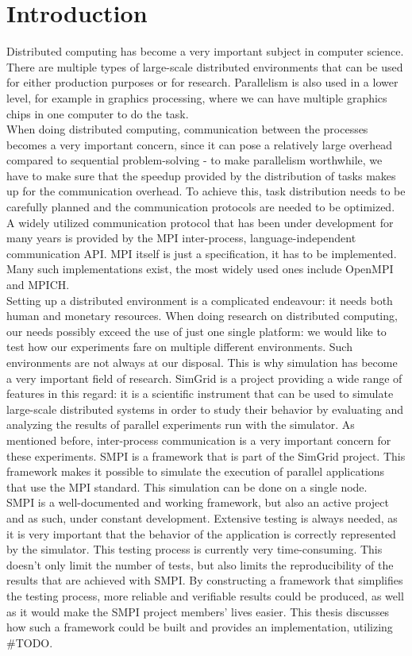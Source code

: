
\chapter{Introduction}
\label{Chapter1}
Distributed computing has become a very important subject in computer
science. There are multiple types of large-scale distributed
environments that can be used for either production purposes or for
research. Parallelism is also used in a lower level, for example in
graphics processing, where we can have multiple graphics chips in one
computer to do the task.\\
When doing distributed computing, communication between the processes
becomes a very important concern, since it can pose a relatively large
overhead compared to sequential problem-solving - to make parallelism
worthwhile, we have to make sure that the speedup provided by the
distribution of tasks makes up for the communication overhead. To
achieve this, task distribution needs to be carefully planned and the
communication protocols are needed to be optimized. A widely utilized
communication protocol that has been under development for many years
is provided by the MPI\cite{mpif12} inter-process, language-independent
communication API. MPI itself is just a specification, it has to be
implemented. Many such implementations exist, the most widely used
ones include OpenMPI\cite{ompi04} and MPICH\cite{mpich12}.\\
Setting up a distributed environment is a complicated endeavour: it
needs both human and monetary resources. When doing research on
distributed computing, our needs possibly exceed the use of just one
single platform: we would like to test how our experiments fare on
multiple different environments. Such environments are not always at
our disposal. This is why simulation has become a very important field
of research. SimGrid\cite{clq08} is a project providing a wide range
of features in this regard: it is a scientific instrument that can be
used to simulate large-scale distributed systems in order to study
their behavior by evaluating and analyzing the results of parallel
experiments run with the simulator. As mentioned before, inter-process
communication
is a very important concern for these experiments. SMPI is a framework
that is part of the SimGrid project. This framework makes it possible
to simulate the execution of parallel applications that use the MPI
standard. This simulation can be done on a single node.\\
SMPI is a well-documented and working framework, but also an active
project and as such, under constant development. Extensive testing is
always needed, as it is very important that the behavior of the
application is correctly represented by the simulator. This testing
process is currently very time-consuming. This doesn't only limit the
number of tests, but also limits the reproducibility of the results
that are achieved with SMPI. By constructing a framework that
simplifies the testing process, more reliable and verifiable results
could be produced, as well as it would make the SMPI project members'
lives easier. This thesis discusses how such a framework could be
built and provides an implementation, utilizing \#TODO.
